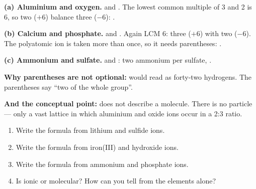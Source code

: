 \documentclass{apchem-worksheet}
\begin{document}
\begin{workedexample}
\textbf{(a) Aluminium and oxygen.}  and . The lowest
common multiple of 3 and 2 is 6, so two  ($+6$) balance three
 ($-6$): \textbf{}.

\textbf{(b) Calcium and phosphate.}  and . Again
LCM 6: three  ($+6$) with two  ($-6$). The
polyatomic ion is taken more than once, so it needs parentheses:
\textbf{}.

\textbf{(c) Ammonium and sulfate.}  and : two
ammonium per sulfate, \textbf{}.

\textbf{Why parentheses are not optional:}  would read as
forty-two hydrogens. The parentheses say ``two of the whole group''.

\textbf{And the conceptual point:}  does not describe a
molecule. There is no  particle --- only a vast lattice in
which aluminium and oxide ions occur in a 2:3 ratio.
\end{workedexample}

\begin{yourturn}
\begin{enumerate}[leftmargin=*,itemsep=0.5em]
  \item Write the formula from lithium and sulfide ions.
        \workspace[1.2cm]
  \item Write the formula from iron(III) and hydroxide ions.
        \workspace[1.4cm]
  \item Write the formula from ammonium and phosphate ions.
        \workspace[1.4cm]
  \item Is  ionic or molecular? How can you tell from the
        elements alone? \workspace[1.6cm]
\end{enumerate}
\end{yourturn}
\end{document}

